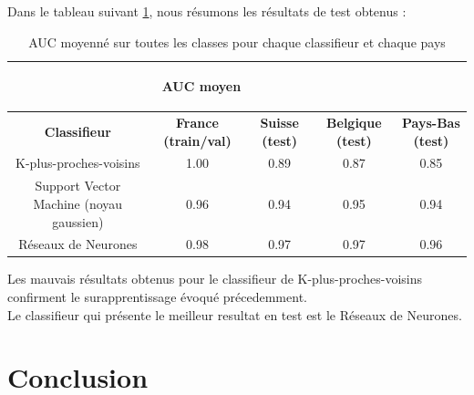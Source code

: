\documentclass{book}
\begin{document}
Dans le tableau suivant \ref{resultats}, nous résumons les résultats de test obtenus :

 \begin{table}[H]
    \begin{center}
    \begin{adjustbox}{max width=\textwidth}
    {\scriptsize
    \begin{tabular}{|c|c|c|c|c|}
      \hline
      \multicolumn{4}{|c|}{\begin{bf} AUC moyen\end{bf}} \\
      \hline
      \textbf{Classifieur} & \textbf{France (train/val)} & \textbf{Suisse (test)} & \textbf{Belgique (test)} & \textbf{Pays-Bas (test)}\\
      \hline
      K-plus-proches-voisins & 1.00 & 0.89 & 0.87 & 0.85\\
      \hline
      Support Vector Machine (noyau gaussien)& 0.96 & 0.94 & 0.95 & 0.94\\
      \hline
      Réseaux de Neurones & 0.98 & 0.97 & 0.97 & 0.96\\
      \hline
    \end{tabular}
    }
    \end{adjustbox}
    \label{resultats}
    \caption{AUC moyenné sur toutes les classes pour chaque classifieur et chaque pays}
    \end{center}
  \end{table}
  
 Les mauvais résultats obtenus pour le classifieur de K-plus-proches-voisins confirment le surapprentissage 
 évoqué précedemment.\\
 Le classifieur qui présente le meilleur resultat en test est le Réseaux de Neurones.
  
  
\chapter{Conclusion}
\end{document}
